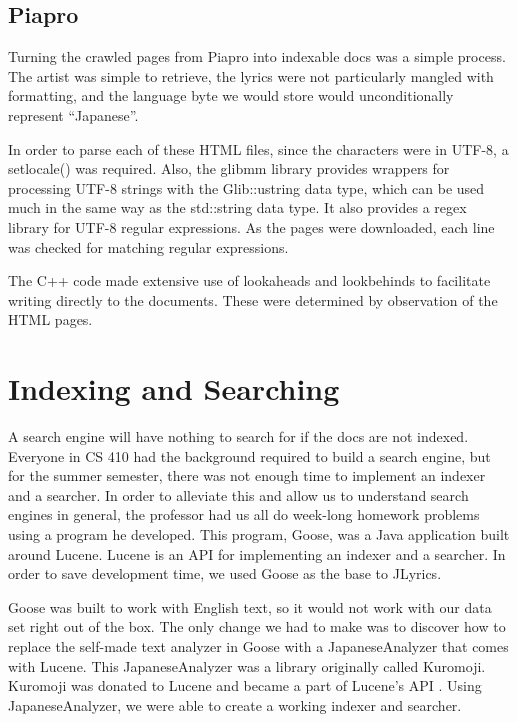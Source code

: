 \documentclass{acm} %
\begin{document}
\begin{CJK}{UTF8}{zhsong}
\subsection{Piapro}

Turning the crawled pages from Piapro into indexable docs was a simple process. The artist was simple to retrieve, the lyrics were not particularly mangled with formatting, and the language byte we would store would unconditionally represent ``Japanese''.

In order to parse each of these HTML files, since the characters were in UTF-8, a setlocale() was required. Also, the glibmm library provides wrappers for processing UTF-8 strings with the Glib::ustring data type, which can be used much in the same way as the std::string data type. It also provides a regex library for UTF-8 regular expressions. As the pages were downloaded, each line was checked for matching regular expressions.

The C++ code made extensive use of lookaheads and lookbehinds to facilitate writing directly to the documents. These were determined by observation of the HTML pages.

\section{Indexing and Searching}

A search engine will have nothing to search for if the docs are not indexed. Everyone in CS 410 had the background required to build a search engine, but for the summer semester, there was not enough time to implement an indexer and a searcher. In order to alleviate this and allow us to understand search engines in general, the professor had us all do week-long homework problems using a program he developed. This program, Goose, was a Java application built around Lucene. Lucene is an API for implementing an indexer and a searcher. In order to save development time, we used Goose as the base to JLyrics.

Goose was built to work with English text, so it would not work with our data set right out of the box. The only change we had to make was to discover how to replace the self-made text analyzer in Goose with a JapaneseAnalyzer that comes with Lucene. This JapaneseAnalyzer was a library originally called Kuromoji. Kuromoji was donated to Lucene and became a part of Lucene's API \cite{kuromoji-donate}. Using JapaneseAnalyzer, we were able to create a working indexer and searcher.


\end{CJK}
\end{document}
